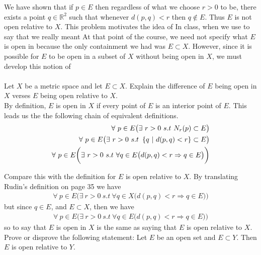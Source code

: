 \documentclass[12pt]{article}
\begin{document}
We have shown that if $p \in E$ then regardless of what we choose $r>0$ to be, there exists a point $q \in \mathbb{R}^{2}$ such that whenever $d(p,q)<r$ then $q \notin E$. Thus $E$ is not open relative to $X$. This problem motivates the idea of  In class, when we use to say that  we really meant  At that point of the course, we need not specify what $E$ is open in because the only containment we had was $E \subset X$. However, since it is possible for $E$ to be open in a subset of $X$ without being open in $X$, we must develop this notion of  \\ \\

\problem Let $X$ be a metric space and let $E \subset X$. Explain the difference of $E$ being open in $X$ verses $E$ being open relative to $X$. \\

By definition, $E$ is open in $X$ if every point of $E$ is an interior point of $E$. This leads us the the following chain of equivalent definitions.
\begin{align}
\forall ~p \in E \big( \exists ~ r>0 ~s.t~ N_{r}(p) \subset E \big) \\
\forall ~p \in E \big( \exists ~ r>0 ~s.t~ \left\{q~|~d(p,q)<r\right\} \subset E \big) \\
\forall ~p \in E \bigg( \exists ~ r>0 ~s.t~  \forall q \in E \big(d(p,q)<r \Rightarrow q \in E \big) \bigg)
\end{align}

Compare this with the definition for $E$ is open relative to $X$. By translating Rudin's definition on page 35 we have 
\begin{align}
\forall ~p \in E \bigg( \exists ~ r>0 ~s.t~  \forall q \in X \big(d(p,q)<r \Rightarrow q \in E \big) \bigg)
\end{align}
but since $q \in E$, and $E \subset X$, then we have 
\begin{align}
\forall ~p \in E \bigg( \exists ~ r>0 ~s.t~  \forall q \in E \big(d(p,q)<r \Rightarrow q \in E \big) \bigg)
\end{align}
so to say that  $E$ is open in $X$ is the same as saying that $E$ is open relative to $X$. \\

\problem Prove or disprove the following statement: Let $E$ be an open set and $E \subset Y$. Then $E$ is open relative to $Y$. \\ 
\end{document}
